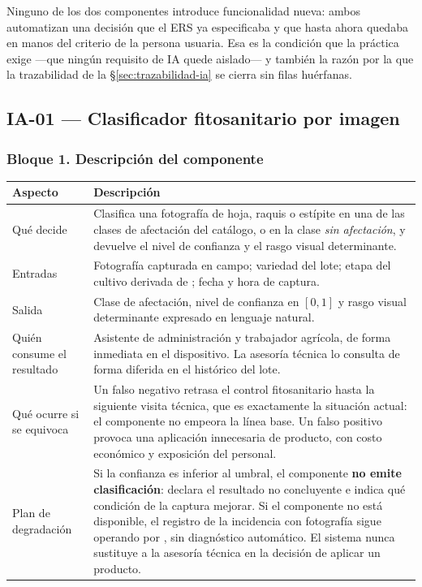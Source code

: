 \noindent
Ninguno de los dos componentes introduce funcionalidad nueva: ambos automatizan una decisión que el
ERS ya especificaba y que hasta ahora quedaba en manos del criterio de la persona usuaria. Esa es la
condición que la práctica exige ---que ningún requisito de IA quede aislado--- y también la razón por
la que la trazabilidad de la \S\ref{sec:trazabilidad-ia} se cierra sin filas huérfanas.

\subsection{IA-01 --- Clasificador fitosanitario por imagen}

\subsubsection*{Bloque 1. Descripción del componente}

\begin{table}[H]
\centering\footnotesize
\begin{tabular}{|L{3.6cm}|L{11.8cm}|}
\hline
{}\textbf{Aspecto} & \textbf{Descripción}\\ \hline
Qué decide & Clasifica una fotografía de hoja, raquis o estípite en una de las clases de afectación del catálogo, o en la clase \emph{sin afectación}, y devuelve el nivel de confianza y el rasgo visual determinante.\\ \hline
Entradas & Fotografía capturada en campo; variedad del lote; etapa del cultivo derivada de ; fecha y hora de captura.\\ \hline
Salida & Clase de afectación, nivel de confianza en $[0,1]$ y rasgo visual determinante expresado en lenguaje natural.\\ \hline
Quién consume el resultado & Asistente de administración y trabajador agrícola, de forma inmediata en el dispositivo. La asesoría técnica lo consulta de forma diferida en el histórico del lote.\\ \hline
Qué ocurre si se equivoca & Un falso negativo retrasa el control fitosanitario hasta la siguiente visita técnica, que es exactamente la situación actual: el componente no empeora la línea base. Un falso positivo provoca una aplicación innecesaria de producto, con costo económico y exposición del personal.\\ \hline
Plan de degradación & Si la confianza es inferior al umbral, el componente \textbf{no emite clasificación}: declara el resultado no concluyente e indica qué condición de la captura mejorar. Si el componente no está disponible, el registro de la incidencia con fotografía sigue operando por , sin diagnóstico automático. El sistema nunca sustituye a la asesoría técnica en la decisión de aplicar un producto.\\ \hline
\end{tabular}
\end{table}

